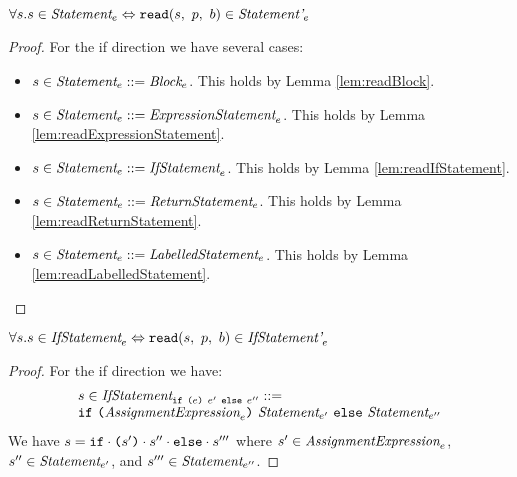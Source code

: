 \documentclass[preprint,10pt]{sigplanconf}
\begin{document}
\begin{lemma}\mbox{}
  
  \( \forall s. s \in \textit{Statement}_{e} \Leftrightarrow 
  \texttt{read}(s,~p,~b) \in \textit{Statement'}_{e} \)
\end{lemma}
\begin{proof}
  For the if direction we have several cases:
  \begin{itemize}
  \item \( s \in \textit{Statement}_{e} ::= \textit{Block}_{e} \). This
    holds by Lemma \ref{lem:readBlock}.

  \item \( s \in \textit{Statement}_{e} ::= \textit{ExpressionStatement}_{e} \). This
    holds by Lemma \ref{lem:readExpressionStatement}.

  \item \( s \in \textit{Statement}_{e} ::= \textit{IfStatement}_{e} \). This
    holds by Lemma \ref{lem:readIfStatement}.

  \item \( s \in \textit{Statement}_{e} ::= \textit{ReturnStatement}_{e} \). This
    holds by Lemma \ref{lem:readReturnStatement}.

  \item \( s \in \textit{Statement}_{e} ::= \textit{LabelledStatement}_{e} \). This
    holds by Lemma \ref{lem:readLabelledStatement}.
  \end{itemize}
\end{proof}

\begin{lemma}\mbox{}
  
  \( \forall s. s \in \textit{IfStatement}_{e} \Leftrightarrow 
  \texttt{read}(s,~p,~b) \in \textit{IfStatement'}_{e} \)
\end{lemma}
\begin{proof}
  For the if direction we have:
  \[
  \begin{array}{lcl}
    s \in
    \textit{IfStatement}_{\texttt{if}~\texttt{(}e\texttt{)}~e'~\texttt{else}~ e''} 
    ::= 
    \\
    \texttt{if}~ \texttt{(}\textit{AssignmentExpression}_{e}\texttt{)}~
    \textit{Statement}_{e'}~\texttt{else}~ \textit{Statement}_{e''} 
  \end{array}
  \]
  We have \( s = \texttt{if}\cdot \texttt{(}s'\texttt{)}\cdot s''\cdot
  \texttt{else}\cdot s''' \) where \( s' \in
  \textit{AssignmentExpression}_{e} \), \( s'' \in \textit{Statement}_{e'}
  \), and \( s''' \in \textit{Statement}_{e''} \).
\end{proof}
\end{document}
